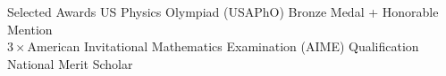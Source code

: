 \documentclass[
	11pt, %
]{resume} %
\begin{document}
\begin{rSection}{Selected Awards}
US Physics Olympiad (USAPhO) Bronze Medal + Honorable Mention \\ $3\times$American Invitational Mathematics Examination (AIME) Qualification \\ National Merit Scholar
\end{rSection}







\end{document}
